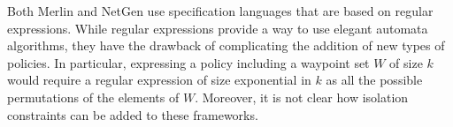 Both Merlin and NetGen use specification languages that are based on regular expressions. 
While regular expressions provide a way to 
use elegant automata algorithms, they have the drawback of complicating the addition of new types of policies.
In particular, expressing a policy including a waypoint set $W$ of size $k$ would require a regular expression of size exponential
in $k$ as all the possible permutations of the elements of $W$.
Moreover, it is not clear how isolation constraints can be added to these frameworks.


